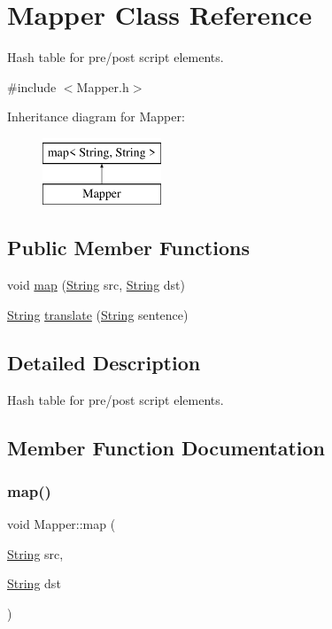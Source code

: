 \hypertarget{classMapper}{}\section{Mapper Class Reference}
\label{classMapper}


Hash table for pre/post script elements.  




{\ttfamily \#include $<$Mapper.\+h$>$}

Inheritance diagram for Mapper\+:\begin{figure}[H]
\begin{center}
\leavevmode
\includegraphics[height=2.000000cm]{classMapper}
\end{center}
\end{figure}
\subsection*{Public Member Functions}
\begin{DoxyCompactItemize}
\item 
void \mbox{\hyperlink{classMapper_aec2d64e739da82af037709cb63d52064}{map}} (\mbox{\hyperlink{classString}{String}} src, \mbox{\hyperlink{classString}{String}} dst)
\item 
\mbox{\hyperlink{classString}{String}} \mbox{\hyperlink{classMapper_a5badcd576626a91fc9b0f76345a64ba8}{translate}} (\mbox{\hyperlink{classString}{String}} sentence)
\end{DoxyCompactItemize}


\subsection{Detailed Description}
Hash table for pre/post script elements. 

\subsection{Member Function Documentation}
\mbox{\label{classMapper_aec2d64e739da82af037709cb63d52064}} 
\subsubsection{\texorpdfstring{map()}{map()}}
{\footnotesize\ttfamily void Mapper\+::map (\begin{DoxyParamCaption}\item[{\mbox{\hyperlink{classString}{String}}}]{src,  }\item[{\mbox{\hyperlink{classString}{String}}}]{dst }\end{DoxyParamCaption})}

